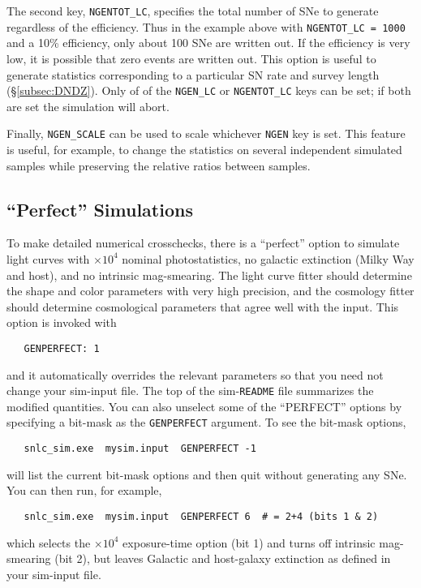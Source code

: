 \documentclass[12pt]{article}
\begin{document}
The second key, {\tt NGENTOT\_LC}, specifies the total number of SNe
to generate regardless of the efficiency. Thus in the example above
with {\tt NGENTOT\_LC = 1000} and a 10\% efficiency, only about 
100 SNe are written out. If the efficiency is very low, it is possible
that zero events are written out.  This option is useful to generate
statistics corresponding to a particular SN rate and survey length
(\S\ref{subsec:DNDZ}).
Only of of the {\tt NGEN\_LC} or {\tt NGENTOT\_LC} keys can be set;
if both are set the simulation will abort.

Finally, {\tt NGEN\_SCALE} can be used to scale whichever {\tt NGEN} 
key is set. This feature is useful, for example, to change
the statistics on several independent simulated samples while 
preserving the relative ratios between samples.


   \subsection{``Perfect'' Simulations}
   \label{subsec:sim_perfect}


To make detailed numerical crosschecks,
there is a ``perfect'' option to simulate light curves
with $\times 10^4$ nominal photostatistics, no galactic
extinction (Milky Way and host), and no intrinsic mag-smearing.
The light curve fitter should determine the shape and color
parameters with very high precision, and the cosmology fitter
should determine cosmological parameters that agree well
with the input. This option is invoked with
%
\begin{verbatim}
   GENPERFECT: 1
\end{verbatim}
%
and it automatically overrides the relevant parameters
so that you need not change your sim-input file.
The top of the sim-{\tt README} file summarizes
the modified quantities.
You can also unselect some of the ``PERFECT'' options
by specifying a bit-mask as the {\tt GENPERFECT} argument.
To see the bit-mask options,
%
\begin{verbatim}
   snlc_sim.exe  mysim.input  GENPERFECT -1
\end{verbatim}
%
will list the current bit-mask options
and then quit without generating any SNe. 
You can then run, for example,
\begin{verbatim}
   snlc_sim.exe  mysim.input  GENPERFECT 6  # = 2+4 (bits 1 & 2)
\end{verbatim}
%
which selects the $\times 10^4$ exposure-time option 
(bit 1) and turns off intrinsic mag-smearing (bit 2), 
but leaves Galactic and host-galaxy extinction as defined 
in your sim-input file.
\end{document}
